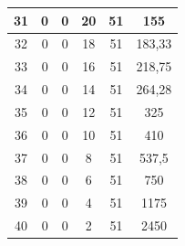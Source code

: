 \begin{table}[]
\begin{tabular}{|c|c|c|c|c|c|}
 			31                                           & 0                      & 0                     & 20                    & 51                     & 155                                                \\ \hline
 			32                                           & 0                      & 0                     & 18                    & 51                     & 183,33                                       \\ \hline
 			33                                           & 0                      & 0                     & 16                    & 51                     & 218,75                                             \\ \hline
 			34                                           & 0                      & 0                     & 14                    & 51                     & 264,28                                        \\ \hline
 			35                                           & 0                      & 0                     & 12                    & 51                     & 325                                                \\ \hline
 			36                                           & 0                      & 0                     & 10                    & 51                     & 410                                                \\ \hline
 			37                                           & 0                      & 0                     & 8                     & 51                     & 537,5                                              \\ \hline
 			38                                           & 0                      & 0                     & 6                     & 51                     & 750                                                \\ \hline
 			39                                           & 0                      & 0                     & 4                     & 51                     & 1175                                               \\ \hline
 			40                                           & 0                      & 0                     & 2                     & 51                     & 2450                                               \\ \hline
 		\end{tabular}
 \end{table} 
